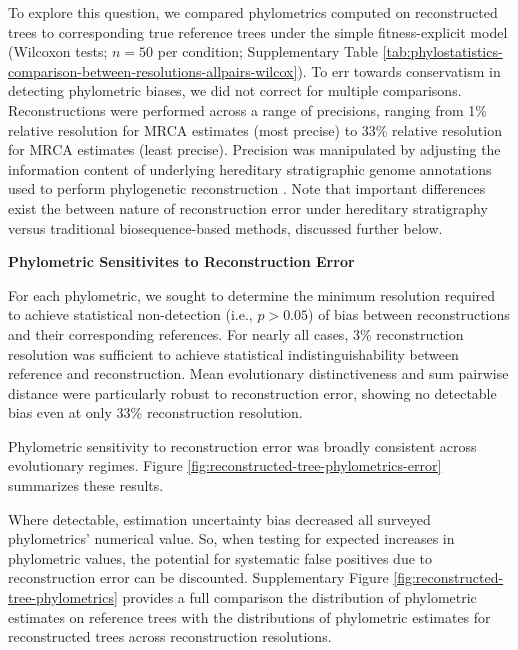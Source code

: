 To explore this question, we compared phylometrics computed on reconstructed trees to corresponding true reference trees under the simple fitness-explicit model (Wilcoxon tests; $n=50$ per condition; Supplementary Table \ref{tab:phylostatistics-comparison-between-resolutions-allpairs-wilcox}).
To err towards conservatism in detecting phylometric biases, we did not correct for multiple comparisons.
Reconstructions were performed across a range of precisions, ranging from 1\% relative resolution for MRCA estimates (most precise) to 33\% relative resolution for MRCA estimates (least precise).
Precision was manipulated by adjusting the information content of underlying hereditary stratigraphic genome annotations used to perform phylogenetic reconstruction \citep{moreno2022hereditary}.
Note that important differences exist the between nature of reconstruction error under hereditary stratigraphy versus traditional biosequence-based methods, discussed further below.

\textbf{Phylometric Sensitivites to Reconstruction Error}



For each phylometric, we sought to determine the minimum resolution required to achieve statistical non-detection (i.e., $p > 0.05$) of bias between reconstructions and their corresponding references.
For nearly all cases, 3\% reconstruction resolution was sufficient to achieve statistical indistinguishability between reference and reconstruction.
Mean evolutionary distinctiveness and sum pairwise distance were particularly robust to reconstruction error, showing no detectable bias even at only 33\% reconstruction resolution.

Phylometric sensitivity to reconstruction error was broadly consistent across evolutionary regimes.
Figure \ref{fig:reconstructed-tree-phylometrics-error} summarizes these results.

Where detectable, estimation uncertainty bias decreased all surveyed phylometrics' numerical value.
So, when testing for expected increases in phylometric values, the potential for systematic false positives due to reconstruction error can be discounted.
Supplementary Figure \ref{fig:reconstructed-tree-phylometrics} provides a full comparison the distribution of phylometric estimates on reference trees with the distributions of phylometric estimates for reconstructed trees across reconstruction resolutions.

